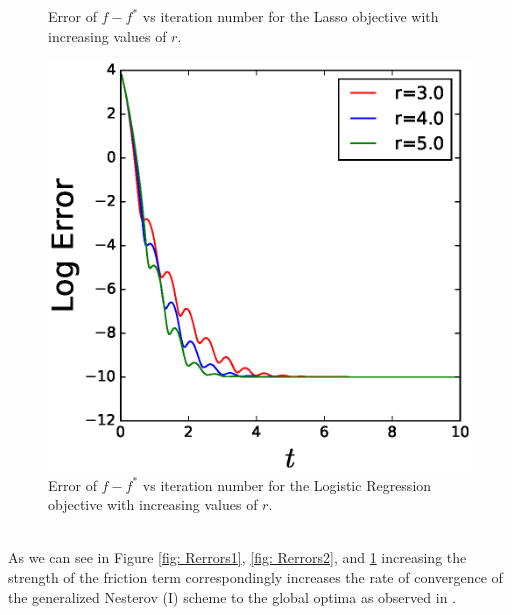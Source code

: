 \begin{figure}[!htb]
\caption{Error of $f-f^*$ vs iteration number for the Lasso objective with increasing values of $r$.}
\label{fig: Rerrors2}
\endminipage\hfill
{}%
 \includegraphics[width=1\linewidth]{SourceFiles/plots/logistic_regression_errors_compare.eps}
\caption{Error of $f-f^*$ vs iteration number for the Logistic Regression objective with increasing values of $r$.}
\label{fig: Rerrors3}
\endminipage
\end{figure}

\\ 
As we can see in Figure \ref{fig: Rerrors1}, \ref{fig: Rerrors2}, and \ref{fig: Rerrors3} increasing the strength of the friction term correspondingly increases the rate of convergence of the generalized Nesterov (I) scheme to the global optima as observed in \cite{su2014differential}.
 
